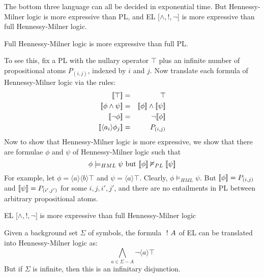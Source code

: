 The bottom three language can all be decided in exponential time.
But Hennessy-Milner logic is more expressive than PL, and EL [$\land, !, \neg$]  is more expressive than full Hennessy-Milner logic. 
\begin{proposition}
Full Hennessy-Milner logic  is more expressive than full PL.
\end{proposition}
To see this, fix a PL with the nullary operator $\top$ plus an infinite number of propositional atoms $P_{(i,j)}$, indexed by $i$ and $j$.
Now translate each formula of Hennessy-Milner logic via the rules:
\begin{eqnarray*}
\SEMB{\top}  & = & \top  \\
\SEMB{\phi \land \psi} & = & \SEMB{\phi} \land \SEMB{\psi}  \\
\SEMB{\neg \phi} & = & \neg \SEMB{\phi}   \\
\SEMB{\langle a_i \rangle \phi_j} & = & P_{(i,j)} 
\end{eqnarray*}
Now to show that Hennessy-Milner logic is more expressive, we show that there are formulae $\phi$ and $\psi$ of Hennessy-Milner logic such that
\[
\phi \models_{HML} \psi \mbox{ but } \lbrack\!\lbrack \phi \rbrack\!\rbrack \nvDash_{PL} \lbrack\!\lbrack \psi \rbrack\!\rbrack
\]
For example, let $\phi = \langle a \rangle \langle b \rangle \top$ and $\psi = \langle a \rangle \top$.
Clearly, $\phi \models_{HML} \psi$. But $\lbrack\!\lbrack \phi \rbrack\!\rbrack = P_{(i,j)}$ and $\lbrack\!\lbrack \psi \rbrack\!\rbrack = P_{(i',j')}$ for some $i,j,i',j'$, and there are no entailments in PL between arbitrary propositional atoms.

\begin{proposition}
EL [$\land, !, \neg$]  is more expressive than full Hennessy-Milner logic
\end{proposition}
Given a background set $\Sigma$ of symbols, the formula $\ ! \  A$ of EL can be translated into Hennessy-Milner logic as:
\[
\bigwedge_{a \in \Sigma - A} \neg \langle a \rangle \top
\]
But if $\Sigma$ is infinite, then this is an infinitary disjunction.
